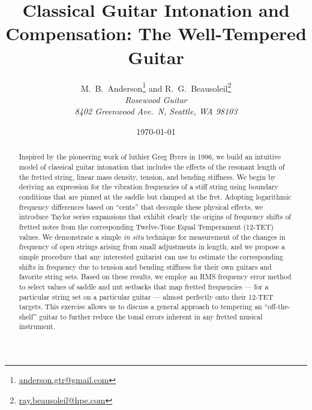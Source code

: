 \documentclass[12pt]{article}
\title{{\Huge\textbf{Classical Guitar Intonation and Compensation: The Well-Tempered Guitar}}}
\author{ M.\ B.\ Anderson\footnote{\href{mailto:anderson.gtr@gmail.com}{anderson.gtr@gmail.com}} and R.\ G.\ Beausoleil\footnote{\href{mailto:ray.beausoleil@hpe.com}{ray.beausoleil@hpe.com}} \\
 \textit{Rosewood Guitar} \\
 \textit{8402 Greenwood Ave.\ N, Seattle, WA  98103}}
\date{\today}
\begin{document}
 \maketitle

 \begin{abstract}
Inspired by the pioneering work of luthier Greg Byers in 1996, we build an intuitive model of classical guitar intonation that includes the effects of the resonant length of the fretted string, linear mass density, tension, and bending stiffness. We begin by deriving an expression for the vibration frequencies of a stiff string using boundary conditions that are pinned at the saddle but clamped at the fret. Adopting logarithmic frequency differences based on ``cents'' that decouple these physical effects, we introduce Taylor series expansions that exhibit clearly the origins of frequency shifts of fretted notes from the corresponding Twelve-Tone Equal Temperament (12-TET) values. We demonstrate a simple \emph{in situ} technique for measurement of the changes in frequency of open strings arising from small adjustments in length, and we propose a simple procedure that any interested guitarist can use to estimate the corresponding shifts in frequency due to tension and bending stiffness for their own guitars and favorite string sets. Based on these results, we employ an RMS frequency error method to select values of saddle and nut setbacks that map fretted frequencies --- for a particular string set on a particular guitar --- almost perfectly onto their 12-TET targets. This exercise allows us to discuss a general approach to tempering an ``off-the-shelf'' guitar to further reduce the tonal errors inherent in any fretted musical instrument.
 \end{abstract}

 \tableofcontents

 
 
 
 
 
 

 \appendix
 
 
 
 


 
 

 
\end{document}
